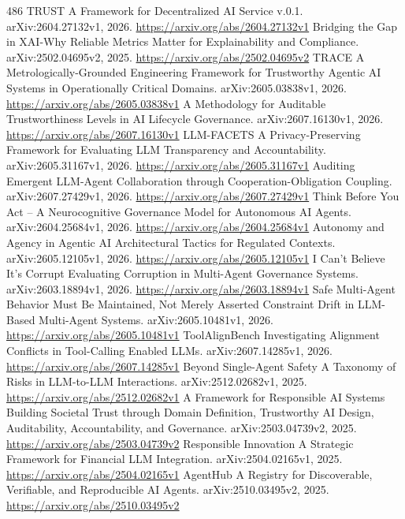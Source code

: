 \documentclass[11pt]{article}
\begin{document}
\begin{thebibliography}{486}
 TRUST A Framework for Decentralized AI Service v.0.1. arXiv:2604.27132v1, 2026. \url{https://arxiv.org/abs/2604.27132v1}
 Bridging the Gap in XAI-Why Reliable Metrics Matter for Explainability and Compliance. arXiv:2502.04695v2, 2025. \url{https://arxiv.org/abs/2502.04695v2}
 TRACE A Metrologically-Grounded Engineering Framework for Trustworthy Agentic AI Systems in Operationally Critical Domains. arXiv:2605.03838v1, 2026. \url{https://arxiv.org/abs/2605.03838v1}
 A Methodology for Auditable Trustworthiness Levels in AI Lifecycle Governance. arXiv:2607.16130v1, 2026. \url{https://arxiv.org/abs/2607.16130v1}
 LLM-FACETS A Privacy-Preserving Framework for Evaluating LLM Transparency and Accountability. arXiv:2605.31167v1, 2026. \url{https://arxiv.org/abs/2605.31167v1}
 Auditing Emergent LLM-Agent Collaboration through Cooperation-Obligation Coupling. arXiv:2607.27429v1, 2026. \url{https://arxiv.org/abs/2607.27429v1}
 Think Before You Act -- A Neurocognitive Governance Model for Autonomous AI Agents. arXiv:2604.25684v1, 2026. \url{https://arxiv.org/abs/2604.25684v1}
 Autonomy and Agency in Agentic AI Architectural Tactics for Regulated Contexts. arXiv:2605.12105v1, 2026. \url{https://arxiv.org/abs/2605.12105v1}
 I Can't Believe It's Corrupt Evaluating Corruption in Multi-Agent Governance Systems. arXiv:2603.18894v1, 2026. \url{https://arxiv.org/abs/2603.18894v1}
 Safe Multi-Agent Behavior Must Be Maintained, Not Merely Asserted Constraint Drift in LLM-Based Multi-Agent Systems. arXiv:2605.10481v1, 2026. \url{https://arxiv.org/abs/2605.10481v1}
 ToolAlignBench Investigating Alignment Conflicts in Tool-Calling Enabled LLMs. arXiv:2607.14285v1, 2026. \url{https://arxiv.org/abs/2607.14285v1}
 Beyond Single-Agent Safety A Taxonomy of Risks in LLM-to-LLM Interactions. arXiv:2512.02682v1, 2025. \url{https://arxiv.org/abs/2512.02682v1}
 A Framework for Responsible AI Systems Building Societal Trust through Domain Definition, Trustworthy AI Design, Auditability, Accountability, and Governance. arXiv:2503.04739v2, 2025. \url{https://arxiv.org/abs/2503.04739v2}
 Responsible Innovation A Strategic Framework for Financial LLM Integration. arXiv:2504.02165v1, 2025. \url{https://arxiv.org/abs/2504.02165v1}
 AgentHub A Registry for Discoverable, Verifiable, and Reproducible AI Agents. arXiv:2510.03495v2, 2025. \url{https://arxiv.org/abs/2510.03495v2}
\end{thebibliography}
\end{document}
